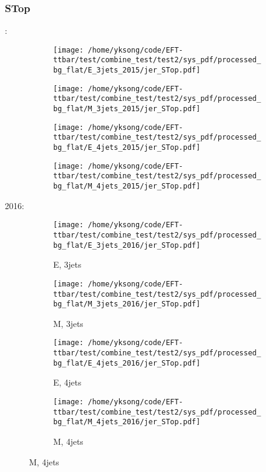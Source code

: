 \documentclass{beamer}
\begin{document}
\begin{frame}
\frametitle{STop}
\fontsize{5}{1}:
\begin{figure}
\centering
\begin{subfigure}[b]{0.24\textwidth}
\texttt{[image: /home/yksong/code/EFT-ttbar/test/combine\_test/test2/sys\_pdf/processed\_bg\_flat/E\_3jets\_2015/jer\_STop.pdf]}
\end{subfigure}
\begin{subfigure}[b]{0.24\textwidth}
\texttt{[image: /home/yksong/code/EFT-ttbar/test/combine\_test/test2/sys\_pdf/processed\_bg\_flat/M\_3jets\_2015/jer\_STop.pdf]}
\end{subfigure}
\begin{subfigure}[b]{0.24\textwidth}
\texttt{[image: /home/yksong/code/EFT-ttbar/test/combine\_test/test2/sys\_pdf/processed\_bg\_flat/E\_4jets\_2015/jer\_STop.pdf]}
\end{subfigure}
\begin{subfigure}[b]{0.24\textwidth}
\texttt{[image: /home/yksong/code/EFT-ttbar/test/combine\_test/test2/sys\_pdf/processed\_bg\_flat/M\_4jets\_2015/jer\_STop.pdf]}
\end{subfigure}
\end{figure}
2016:
\begin{figure}
\centering
\begin{subfigure}[b]{0.24\textwidth}
\texttt{[image: /home/yksong/code/EFT-ttbar/test/combine\_test/test2/sys\_pdf/processed\_bg\_flat/E\_3jets\_2016/jer\_STop.pdf]}
\captionsetup{font=tiny}
\caption{E, 3jets}
\end{subfigure}
\begin{subfigure}[b]{0.24\textwidth}
\texttt{[image: /home/yksong/code/EFT-ttbar/test/combine\_test/test2/sys\_pdf/processed\_bg\_flat/M\_3jets\_2016/jer\_STop.pdf]}
\captionsetup{font=tiny}
\caption{M, 3jets}
\end{subfigure}
\begin{subfigure}[b]{0.24\textwidth}
\texttt{[image: /home/yksong/code/EFT-ttbar/test/combine\_test/test2/sys\_pdf/processed\_bg\_flat/E\_4jets\_2016/jer\_STop.pdf]}
\captionsetup{font=tiny}
\caption{E, 4jets}
\end{subfigure}
\begin{subfigure}[b]{0.24\textwidth}
\texttt{[image: /home/yksong/code/EFT-ttbar/test/combine\_test/test2/sys\_pdf/processed\_bg\_flat/M\_4jets\_2016/jer\_STop.pdf]}
\captionsetup{font=tiny}
\caption{M, 4jets}
\end{subfigure}
\end{figure}
\end{frame}
\end{document}
